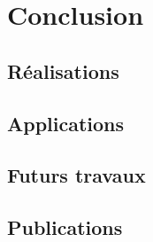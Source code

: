 
\chapter{Conclusion}

\label{ch:conclusions}

\section{Réalisations}

\lipsum[1]

\section{Applications}

\lipsum[1]

\section{Futurs travaux}

\lipsum[1]

\section{Publications}

\lipsum[1]